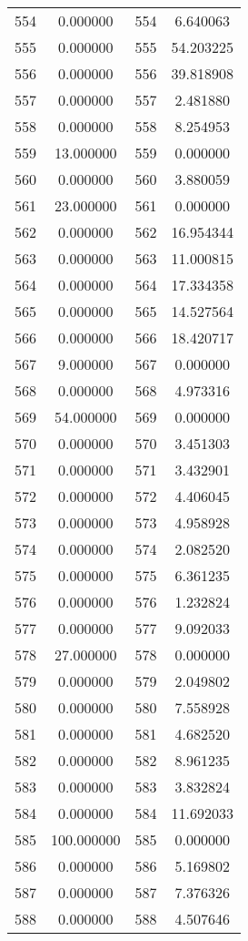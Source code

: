 \documentclass[12pt]{article}
\begin{document}
\begin{longtable}{@{}cccc@{}}
554 & 0.000000 & 554 & 6.640063 \\
555 & 0.000000 & 555 & 54.203225 \\
556 & 0.000000 & 556 & 39.818908 \\
557 & 0.000000 & 557 & 2.481880 \\
558 & 0.000000 & 558 & 8.254953 \\
559 & 13.000000 & 559 & 0.000000 \\
560 & 0.000000 & 560 & 3.880059 \\
561 & 23.000000 & 561 & 0.000000 \\
562 & 0.000000 & 562 & 16.954344 \\
563 & 0.000000 & 563 & 11.000815 \\
564 & 0.000000 & 564 & 17.334358 \\
565 & 0.000000 & 565 & 14.527564 \\
566 & 0.000000 & 566 & 18.420717 \\
567 & 9.000000 & 567 & 0.000000 \\
568 & 0.000000 & 568 & 4.973316 \\
569 & 54.000000 & 569 & 0.000000 \\
570 & 0.000000 & 570 & 3.451303 \\
571 & 0.000000 & 571 & 3.432901 \\
572 & 0.000000 & 572 & 4.406045 \\
573 & 0.000000 & 573 & 4.958928 \\
574 & 0.000000 & 574 & 2.082520 \\
575 & 0.000000 & 575 & 6.361235 \\
576 & 0.000000 & 576 & 1.232824 \\
577 & 0.000000 & 577 & 9.092033 \\
578 & 27.000000 & 578 & 0.000000 \\
579 & 0.000000 & 579 & 2.049802 \\
580 & 0.000000 & 580 & 7.558928 \\
581 & 0.000000 & 581 & 4.682520 \\
582 & 0.000000 & 582 & 8.961235 \\
583 & 0.000000 & 583 & 3.832824 \\
584 & 0.000000 & 584 & 11.692033 \\
585 & 100.000000 & 585 & 0.000000 \\
586 & 0.000000 & 586 & 5.169802 \\
587 & 0.000000 & 587 & 7.376326 \\
588 & 0.000000 & 588 & 4.507646 \\

\end{longtable}
\end{document}
